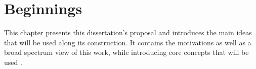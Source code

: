 \chapter{Beginnings}

This chapter presents this dissertation's proposal and introduces the main ideas that will be used along its construction. It contains the motivations as well as a broad spectrum view of this work, while introducing core concepts that will be used
.






